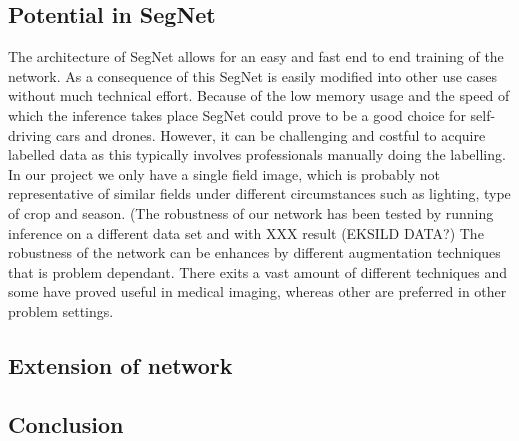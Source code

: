 \documentclass{article}
\begin{document}
\begin{itemize}
\subsection{Potential in SegNet}
The architecture of SegNet allows for an easy and fast end to end training of the network. As a consequence of this SegNet is easily modified into other use cases without much technical effort. Because of the low memory usage and the speed of which the inference takes place SegNet could prove to be a good choice for self-driving cars and drones. However, it can be challenging and costful to acquire labelled data as this typically involves professionals manually doing the labelling. In our project we only have a single field image, which is probably not representative of similar fields under different circumstances such as lighting, type of crop and season. (The robustness of our network has been tested by running inference on a different data set and with XXX result (EKSILD DATA?)  The robustness of the network can be enhances by different augmentation techniques that is problem dependant. There exits a vast amount of different techniques and some have proved useful in medical imaging, whereas other are preferred in other problem settings.
\end{itemize}
\cite{seg}

\subsection{Extension of network}


\subsection{Conclusion}


 
\end{document}
